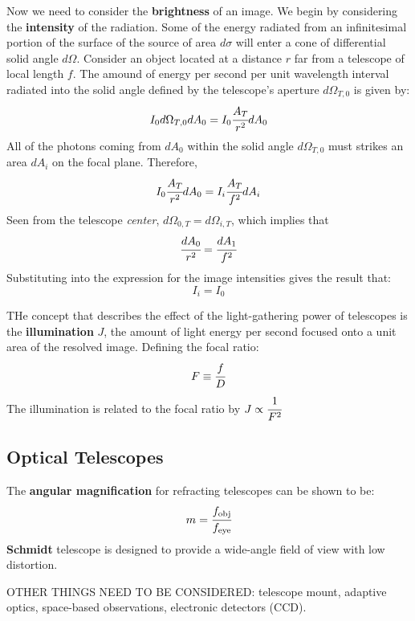 \documentclass{article}
\numberwithin{equation}{section}
\numberwithin{figure}{section}
\begin{document}
	Now we need to consider the {\bf brightness} of an image. We begin by considering the {\bf intensity} of the radiation. Some of the energy radiated from an infinitesimal portion of the surface of the source of area $d\sigma$ will enter a cone of differential solid angle $d\Omega$. Consider an object located at a distance $r$ far from a telescope of local length $f$. The amound of energy per second per unit wavelength interval radiated into the solid angle defined by the telescope's aperture $d\Omega_{T,0}$ is given by:
	\begin{equation}
		I_0d\Omega_{T,0}dA_0 = I_0\cfrac{A_T}{r^2}dA_0
	\end{equation}
	All of the photons coming from $dA_0$ within the solid angle $d\Omega_{T,0}$ must strikes an area $dA_i$ on the focal plane. Therefore,
	\begin{equation}
		I_0\cfrac{A_T}{r^2}dA_0 = I_i\cfrac{A_T}{f^2}dA_i
	\end{equation}
	Seen from the telescope {\it center}, $d\Omega_{0,T} = d\Omega_{i,T}$, which implies that
	\begin{equation}
		\cfrac{dA_0}{r^2} = \cfrac{dA_1}{f^2}
	\end{equation}
	Substituting into the expression for the image intensities gives the result that:
	\begin{equation}
		I_i = I_0
	\end{equation}
	
	THe concept that describes the effect of the light-gathering power of telescopes is the {\bf illumination} $J$, the amount of light energy per second focused onto a unit area of the resolved image. Defining the focal ratio:
	\begin{equation}
		F\equiv\cfrac{f}{D}
	\end{equation}
	The illumination is related to the focal ratio by $J \propto \cfrac{1}{F^2}$
	
	\subsection{Optical Telescopes}
	The {\bf angular magnification} for refracting telescopes can be shown to be:
	\begin{equation}
		m = \cfrac{f_{\rm obj}}{f_{\rm eye}}
	\end{equation}
	{\bf Schmidt} telescope is designed to provide a wide-angle field of view with low distortion. 
	
	OTHER THINGS NEED TO BE CONSIDERED: telescope mount, adaptive optics, space-based observations, electronic detectors (CCD).
	
\end{document}
